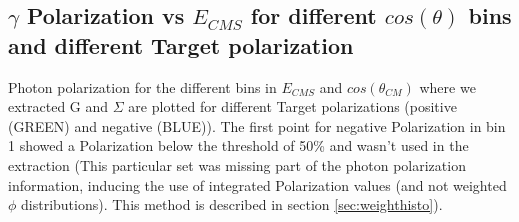 \clearpage
\newpage

\subsection{\texorpdfstring{$\gamma$}{gamma} Polarization vs \texorpdfstring{$E_{CMS}$}{E-CMS} for different \texorpdfstring{$cos(\theta)$}{cos(theta} bins and different Target polarization}
 Photon polarization for the different bins in $E_{CMS}$ and $cos(\theta_{CM})$ where we extracted G and $\Sigma$ are plotted for different Target polarizations (positive (GREEN) and negative (BLUE)). The first point for negative Polarization in bin 1 showed a Polarization below the threshold of 50\% and wasn't used in the extraction (This particular set was missing part of the photon polarization information, inducing the use of integrated Polarization values (and not weighted $\phi$ distributions). This method is described in section \ref{sec:weighthisto}).
\begin{figure}[htb]
  \begin{center}
     \\
  \end{center}
\end{figure}
\begin{figure}[htb]
\ContinuedFloat
  \begin{center} 
     \\    
  \end{center}
\end{figure}

